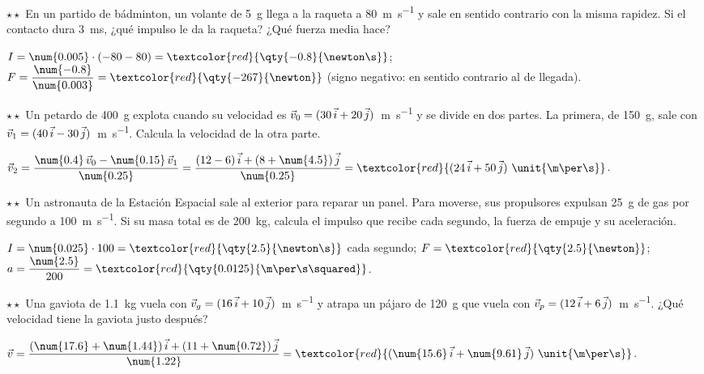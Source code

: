 \begin{exercise}
    \(\star\star\) En un partido de bádminton, un volante de \qty{5}{\g} llega a la raqueta a \qty{80}{\m\per\s} y sale en sentido
    contrario con la misma rapidez. Si el contacto dura \qty{3}{\milli\s}, ¿qué impulso le da la raqueta? ¿Qué fuerza media hace?
    \begin{solu}
        \(I = \num{0.005} \cdot (-80 - 80) = \textcolor{red}{\qty{-0.8}{\newton\s}}\); \(F = \dfrac{\num{-0.8}}{\num{0.003}} =
        \textcolor{red}{\qty{-267}{\newton}}\) (signo negativo: en sentido contrario al de llegada).
    \end{solu}
\end{exercise}

\begin{exercise}
    \(\star\star\) Un petardo de \qty{400}{\g} explota cuando su velocidad es \(\vec{v}_0 = (30\,\vec{i} + 20\,\vec{j})\)~\unit{\m\per\s}
    y se divide en dos partes. La primera, de \qty{150}{\g}, sale con \(\vec{v}_1 = (40\,\vec{i} - 30\,\vec{j})\)~\unit{\m\per\s}.
    Calcula la velocidad de la otra parte.
    \begin{solu}
        \(\vec{v}_2 = \dfrac{\num{0.4}\,\vec{v}_0 - \num{0.15}\,\vec{v}_1}{\num{0.25}} = \dfrac{(12 - 6)\,\ivec + (8 + \num{4.5})\,\jvec}{\num{0.25}}
        = \textcolor{red}{(24\,\ivec + 50\,\jvec)~\unit{\m\per\s}}\).
    \end{solu}
\end{exercise}

\begin{exercise}
    \(\star\star\) Un astronauta de la Estación Espacial sale al exterior para reparar un panel. Para moverse, sus propulsores expulsan
    \qty{25}{\g} de gas por segundo a \qty{100}{\m\per\s}. Si su masa total es de \qty{200}{\kg}, calcula el impulso que recibe cada
    segundo, la fuerza de empuje y su aceleración.
    \begin{solu}
        \(I = \num{0.025} \cdot 100 = \textcolor{red}{\qty{2.5}{\newton\s}}\) cada segundo; \(F = \textcolor{red}{\qty{2.5}{\newton}}\);
        \(a = \dfrac{\num{2.5}}{200} = \textcolor{red}{\qty{0.0125}{\m\per\s\squared}}\).
    \end{solu}
\end{exercise}

\begin{exercise}
    \(\star\star\) Una gaviota de \qty{1.1}{\kg} vuela con \(\vec{v}_g = (16\,\vec{i} + 10\,\vec{j})\)~\unit{\m\per\s} y atrapa un pájaro
    de \qty{120}{\g} que vuela con \(\vec{v}_p = (12\,\vec{i} + 6\,\vec{j})\)~\unit{\m\per\s}. ¿Qué velocidad tiene la gaviota justo
    después?
    \begin{solu}
        \(\vec{v} = \dfrac{(\num{17.6} + \num{1.44})\,\ivec + (11 + \num{0.72})\,\jvec}{\num{1.22}} = \textcolor{red}{(\num{15.6}\,\ivec + \num{9.61}\,\jvec)~\unit{\m\per\s}}\).
    \end{solu}
\end{exercise}

